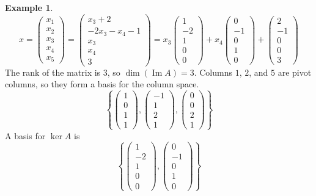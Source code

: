 \documentclass[letterpaper,12pt]{article}
\theoremstyle{definition}
\newtheorem*{example}{Example}
\newcommand{\set}[1]{\left\{ #1 \right\}}
\DeclareMathOperator{\Image}{Im}
\begin{document}
\begin{example}
\begin{equation*}
    x = \begin{pmatrix} x_1 \\ x_2 \\ x_3 \\ x_4 \\ x_5 \end{pmatrix} = \begin{pmatrix} x_3 + 2 \\ -2x_3 - x_4 - 1 \\ x_3 \\ x_4 \\ 3 \end{pmatrix} = x_3 \begin{pmatrix} 1 \\ -2 \\ 1 \\ 0 \\ 0 \end{pmatrix} + x_4 \begin{pmatrix} 0 \\ -1 \\ 0 \\ 1 \\ 0 \end{pmatrix} + \begin{pmatrix} 2 \\ -1 \\ 0 \\ 0 \\ 3 \end{pmatrix}
\end{equation*}
The rank of the matrix is $3$, so $\dim{(\Image{A})} = 3$. Columns $1$, $2$, and $5$ are pivot columns, so they form a basis for the column space.
\begin{equation*}
    \set{\begin{pmatrix} 1 \\ 0 \\ 1 \\ 1 \end{pmatrix}, \begin{pmatrix} -1 \\ 1 \\ 2 \\ 1 \end{pmatrix}, \begin{pmatrix} 0 \\ 0 \\ 2 \\ 1 \end{pmatrix}}
\end{equation*}
A basis for $\ker{A}$ is
\begin{equation*}
    \set{\begin{pmatrix} 1 \\ -2 \\ 1 \\ 0 \\ 0 \end{pmatrix}, \begin{pmatrix} 0 \\ -1 \\ 0 \\ 1 \\ 0 \end{pmatrix}}
\end{equation*}
\end{example}
\end{document}
